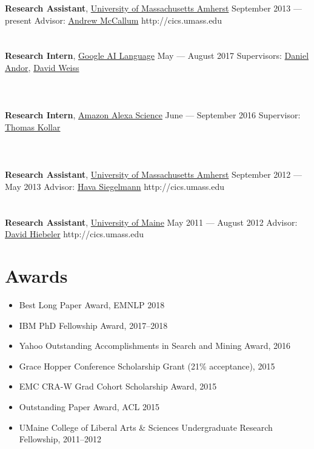 \documentclass{resume}
\begin{document}
\employer
    {\textbf{Research Assistant}, \href{http://cics.umass.edu}{University of Massachusetts Amherst}}
    {September 2013 --- present}
    {Advisor: \href{http://cs.umass.edu/~mccallum}{Andrew McCallum}} {http://cics.umass.edu}
\\ \\ \\
\employer
    {\textbf{Research Intern}, \href{https://ai.google/research/teams/language/}{Google AI Language}}
    {May --- August 2017}
    {Supervisors: \href{https://ai.google/research/people/DanielAndor}{Daniel Andor}, \href{https://ai.google/research/people/DavidWeiss}{David Weiss}}
\\ \\ \\ \\
\employer
    {\textbf{Research Intern}, \href{https://developer.amazon.com/alexa/science}{Amazon Alexa Science}}
    {June --- September 2016}
    {Supervisor: \href{http://www.tkollar.com/}{Thomas Kollar}}
\\ \\ \\ \\
\employer
{\textbf{Research Assistant}, \href{http://cics.umass.edu}{University of Massachusetts Amherst}}
{September 2012 --- May 2013}
{Advisor: \href{http://cs.umass.edu/~hava}{Hava Siegelmann}} {http://cics.umass.edu}
\\ \\ \\
\employer
{\textbf{Research Assistant}, \href{http://umaine.edu/cs/}{University of Maine}}
{May 2011 --- August 2012}
{Advisor: \href{http://www.math.umaine.edu/~hiebeler/}{David Hiebeler}} {http://cics.umass.edu}

\section{Awards}
\begin{itemize}
\item {Best Long Paper Award, EMNLP 2018}
\item {IBM PhD Fellowship Award, 2017--2018}
\item {Yahoo Outstanding Accomplishments in Search and Mining Award, 2016}
\item {Grace Hopper Conference Scholarship Grant (21\% acceptance), 2015}
\item {EMC CRA-W Grad Cohort Scholarship Award, 2015}
\item {Outstanding Paper Award, ACL 2015}
\item {UMaine College of Liberal Arts \& Sciences Undergraduate Research Fellowship, 2011--2012}
\end{itemize}
\clearpage
\end{document}
